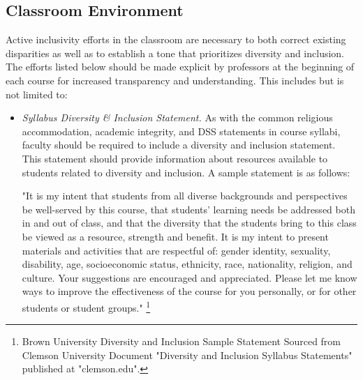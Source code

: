 \documentclass{article}
\begin{document}
\subsection{Classroom Environment} 
Active inclusivity efforts in the classroom are necessary to both correct existing disparities as well as to 
establish a tone that prioritizes diversity and inclusion. The efforts listed below should be made explicit by 
professors at the beginning of each course for increased transparency and understanding. 
This includes but is not limited to: 
\begin{itemize}
\item
\emph{Syllabus Diversity \& Inclusion Statement.} 
As with the common religious accommodation, academic integrity, and DSS statements in course syllabi, 
faculty should be required to include a diversity and inclusion statement. 
This statement should provide information about resources available to students related to diversity and inclusion.
A sample statement is as follows: 
\begin{center}
"It is my intent that students from all diverse backgrounds and perspectives be well-served by this course, 
that students' learning needs be addressed both in and out of class, and that the diversity that the students 
bring to this class be viewed as a resource, strength and benefit. It is my intent to present materials and 
activities that are respectful of: gender identity, sexuality, disability, age, socioeconomic status, ethnicity, 
race, nationality, religion, and culture. Your suggestions are encouraged and appreciated. Please let me know ways to 
improve the effectiveness of the course for you personally, or for other students or student groups."
\footnote[1]{
Brown University Diversity and Inclusion Sample Statement Sourced from Clemson University Document "Diversity and Inclusion Syllabus Statements"
published at "clemson.edu".

}
\end{center}
\end{itemize}
\end{document}
